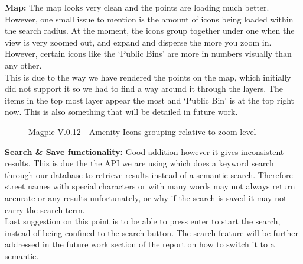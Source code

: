 \newpage
\noindent\textbf{Map: }
The map looks very clean and the points are loading much better. However, one small issue to mention is the amount of icons being loaded within the search radius. At the moment, the icons group together under one when the view is very zoomed out, and expand and disperse the more you zoom in. However, certain icons like the `Public Bins' are more in numbers visually than any other.\\
This is due to the way we have rendered the points on the map, which initially did not support it so we had to find a way around it through the layers. The items in the top most layer appear the most and `Public Bin' is at the top right now. This is also something that will be detailed in future work.\\
\begin{figure}[h!]
    \centering
    \caption{Magpie V.0.12 - Amenity Icons grouping relative to zoom level}
\end{figure}

\noindent \textbf{Search \& Save functionality: }
Good addition however it gives inconsistent results. This is due the the API we are using which does a keyword search through our database to retrieve results instead of a semantic search. Therefore street names with special characters or with many words may not always return accurate or any results unfortunately, or why if the search is saved it may not carry the search term.\\
Last suggestion on this point is to be able to press enter to start the search, instead of being confined to the search button. The search feature will be further addressed in the future work section of the report on how to switch it to a semantic.\\ \\


